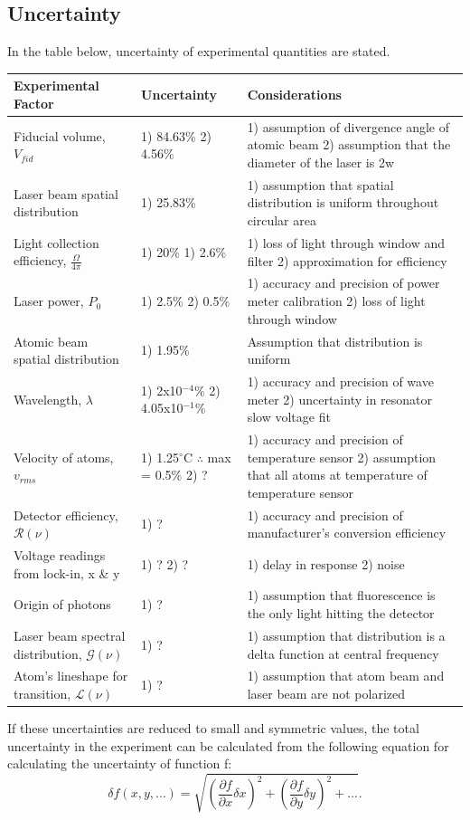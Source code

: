 \documentclass[12pt, a4paper]{article}
\begin{document}
\subsection{Uncertainty}
In the table below, uncertainty of experimental quantities are stated.
\begin{center}
\begin{tabular}{||p{3cm}|p{3cm}|p{8cm}||}
\hline
\bf{Experimental Factor} & \bf{Uncertainty} & \bf{Considerations}\\
\hline
 Fiducial volume, $V_{fid}$ & 1) 84.63\% 2) 4.56\% & 1) assumption of divergence angle of atomic beam 2) assumption that the diameter of the laser is 2w\\
\hline
 Laser beam spatial distribution & 1) 25.83\% & 1) assumption that spatial distribution is uniform throughout circular area \\
 \hline
  Light collection efficiency, $\frac{\Omega}{4\pi}$ & 1) 20\% 1) 2.6\% & 1) loss of light through window and filter 2) approximation for efficiency\\
\hline
 Laser power, $P_0$ & 1) 2.5\% 2) 0.5\% & 1) accuracy and precision of power meter calibration 2) loss of light through window\\
 \hline
  Atomic beam spatial distribution & 1) 1.95\% & Assumption that distribution is uniform \\
  \hline
 Wavelength, $\lambda$ & 1) 2x10$^{-4}$\%  2) 4.05x10$^{-1}$\%& 1) accuracy and precision of wave meter 2) uncertainty in resonator slow voltage fit\\
\hline
\hline
 Velocity of atoms, $v_{rms}$ & 1) 1.25$^{\circ}$C $\therefore$ max = 0.5\% 2) ? & 1) accuracy and precision of temperature sensor 2) assumption that all atoms at temperature of temperature sensor \\
\hline
 Detector efficiency, $\mathcal{R}(\nu)$ & 1) ? & 1) accuracy and precision of manufacturer's conversion efficiency\\
\hline 
 Voltage readings from lock-in, x \& y & 1) ? 2) ? & 1) delay in response 2) noise \\
\hline
 Origin of photons &  1) ? & 1) assumption that fluorescence is the only light hitting the detector\\
\hline
 Laser beam spectral distribution, $\mathscr{G}(\nu)$ & 1) ? & 1) assumption that distribution is a delta function at central frequency \\
\hline
 Atom's lineshape for transition, $\mathscr{L}(\nu)$ & 1) ?  & 1) assumption that atom beam and laser beam are not polarized\\
 \hline
\end{tabular}
\end{center}
If these uncertainties are reduced to small and symmetric values, the total uncertainty in the experiment can be calculated from the following equation for calculating the uncertainty of function f:
\begin{equation}
\delta f(x,y,...) = \sqrt{(\frac{\partial f}{\partial x}\delta x)^2 + (\frac{\partial f}{\partial y}\delta y)^2 + ... }.
\end{equation}
\end{document}
